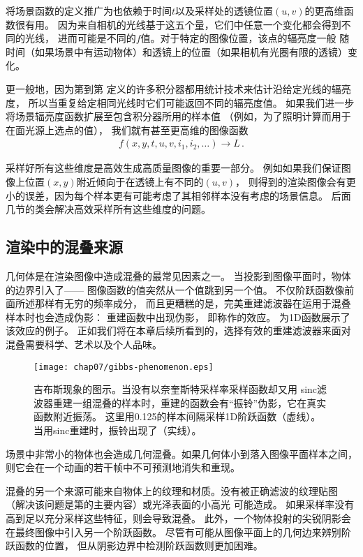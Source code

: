 将场景函数的定义推广为也依赖于时间$t$以及采样处的透镜位置$(u,v)$的更高维函数很有用。
因为来自相机的光线基于这五个量，它们中任意一个变化都会得到不同的光线，
进而可能是不同的$f$值。对于特定的图像位置，该点的辐亮度一般
随时间（如果场景中有运动物体）和透镜上的位置（如果相机有光圈有限的透镜）变化。

更一般地，因为第到第
定义的许多积分器都用统计技术来估计沿给定光线的辐亮度，
所以当重复给定相同光线时它们可能返回不同的辐亮度值。
如果我们进一步将场景辐亮度函数扩展至包含积分器所用的样本值
（例如，为了照明计算而用于在面光源上选点的值），
我们就有甚至更高维的图像函数
\begin{align*}
    f(x,y,t,u,v,i_1,i_2,\ldots)\rightarrow L\, .
\end{align*}

采样好所有这些维度是高效生成高质量图像的重要一部分。
例如如果我们保证图像上位置$(x,y)$附近倾向于在透镜上有不同的$(u,v)$，
则得到的渲染图像会有更小的误差，因为每个样本更有可能考虑了其相邻样本没有考虑的场景信息。
后面几节的类会解决高效采样所有这些维度的问题。

\subsection{渲染中的混叠来源}\label{sub:渲染中的混叠来源}
几何体是在渲染图像中造成混叠的最常见因素之一。
当投影到图像平面时，物体的边界引入了——
图像函数的值突然从一个值跳到另一个值。
不仅阶跃函数像前面所述那样有无穷的频率成分，
而且更糟糕的是，完美重建滤波器在运用于混叠样本时也会造成伪影：
重建函数中出现伪影，
即称作的效应。
为1D函数展示了该效应的例子。
正如我们将在本章后续所看到的，选择有效的重建滤波器来面对混叠需要科学、艺术以及个人品味。
\begin{figure}[htbp]
    \centering\texttt{[image: chap07/gibbs-phenomenon.eps]}
    \caption{吉布斯现象的图示。当没有以奈奎斯特采样率采样函数却又用
        sinc滤波器重建一组混叠的样本时，重建的函数会有“振铃”伪影，它在真实函数附近振荡。
        这里用0.125的样本间隔采样1D阶跃函数（虚线）。当用sinc重建时，振铃出现了（实线）。}
    \label{fig:7.11}
\end{figure}

场景中非常小的物体也会造成几何混叠。如果几何体小到落入图像平面样本之间，
则它会在一个动画的若干帧中不可预测地消失和重现。

混叠的另一个来源可能来自物体上的纹理和材质。没有被正确滤波的纹理贴图
（解决该问题是第的主要内容）或光泽表面的小高光
可能造成。
如果采样率没有高到足以充分采样这些特征，则会导致混叠。
此外，一个物体投射的尖锐阴影会在最终图像中引入另一个阶跃函数。
尽管有可能从图像平面上的几何边来辨别阶跃函数的位置，
但从阴影边界中检测阶跃函数则更加困难。

